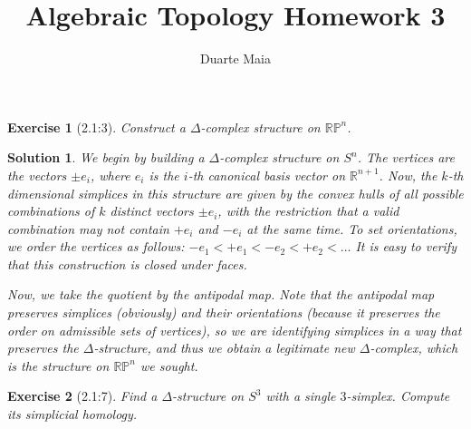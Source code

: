 \documentclass{article}
\title{Algebraic Topology Homework 3}
\author{Duarte Maia}
\theoremstyle{plain}
\newtheorem*{ex}{Exercise}
\theoremstyle{nonumberplain}
\newtheorem{sol}{Solution}
\newcommand{\R}{\mathbb{R}}
\newcommand{\RP}{\mathbb{RP}}
\begin{document}
\maketitle

\begin{ex}[2.1:3]
Construct a $\Delta$-complex structure on $\RP^n$.
\end{ex}

\begin{sol}
We begin by building a $\Delta$-complex structure on $S^n$. The vertices are the vectors $\pm e_i$, where $e_i$ is the $i$-th canonical basis vector on $\R^{n+1}$. Now, the $k$-th dimensional simplices in this structure are given by the convex hulls of all possible combinations of $k$ distinct vectors $\pm e_i$, with the restriction that a valid combination may not contain $+ e_i$ and $- e_i$ at the same time. To set orientations, we order the vertices as follows: $-e_1 < +e_1 < -e_2 < +e_2 < \dots$ It is easy to verify that this construction is closed under faces.

Now, we take the quotient by the antipodal map. Note that the antipodal map preserves simplices (obviously) and their orientations (because it preserves the order on admissible sets of vertices), so we are identifying simplices in a way that preserves the $\Delta$-structure, and thus we obtain a legitimate new $\Delta$-complex, which is the structure on $\RP^n$ we sought.
\end{sol}

\begin{ex}[2.1:7]
Find a $\Delta$-structure on $S^3$ with a single $3$-simplex. Compute its simplicial homology.
\end{ex}
\end{document}
